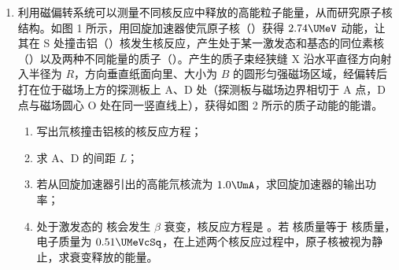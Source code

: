 \documentclass[\gkver]{gaokaozhenti}
\begin{document}
\begin{enumerate}
{又因为超导线圈磁场快速消失的过程中，第二级回路中产生的感应电动势 $E' = \frac{\Delta\Phi}{\Delta t} = \frac{\Phi}{\Delta t}$

感应电流为 $I' = \frac{E'}{R_{2}} = \frac{\Delta\Phi}{R_{2}\Delta t}$

根据动量定理有 $BI'l \cdot \Delta t = mv - mv_{m}$

解得 $v = v_{m} + \frac{B\Phi l}{mR_{2}} = \frac{BUl}{B^{2}l^{2} + kR_{1}} + \frac{B\Phi l}{mR_{2}}$
}

\item
利用磁偏转系统可以测量不同核反应中释放的高能粒子能量，从而研究原子核结构。如图 1 所示，用回旋加速器使氘原子核（）获得 $2.74\UMeV$ 动能，让其在 S 处撞击铝（）核发生核反应，产生处于某一激发态和基态的同位素核（）以及两种不同能量的质子（）。产生的质子束经狭缝 X 沿水平直径方向射入半径为 $R$，方向垂直纸面向里、大小为 $B$ 的圆形匀强磁场区域，经偏转后打在位于磁场上方的探测板上 A、D 处（探测板与磁场边界相切于 A 点，D 点与磁场圆心 O 处在同一竖直线上），获得如图 2 所示的质子动能的能谱。


\begin{enumerate}
	\item
	写出氘核撞击铝核的核反应方程；
	\item
	求 A、D 的间距 $L$；
	\item
	若从回旋加速器引出的高能氘核流为 $1.0\UmA$，求回旋加速器的输出功率；
	\item
	处于激发态的  核会发生 $\beta$ 衰变，核反应方程是 。若  核质量等于  核质量，电子质量为 $0.51\UMeVcSq$，在上述两个核反应过程中，原子核被视为静止，求衰变释放的能量。
\end{enumerate}

\end{enumerate}
\end{document}

